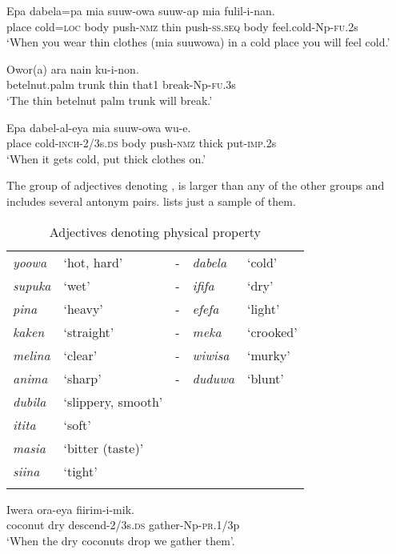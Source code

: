 \ea%
\label{ex:3:x1756}
\gll Epa dabela=pa mia suuw-owa  suuw-ap mia fulil-i-nan.\\
place cold=\textsc{loc} body push-\textsc{nmz} thin push-\textsc{ss}.\textsc{seq} body feel.cold-Np-\textsc{fu}.2s\\
\glt`When you wear thin clothes (mia suuwowa) in a cold place you will feel cold.' 
\z

\ea%
\label{ex:3:x76}
\gll Owor(a) ara   nain ku-i-non. \\
betelnut.palm trunk thin that1 break-Np-\textsc{fu}.3s\\
\glt`The thin betelnut palm trunk will break.'
\z

\ea%
\label{ex:3:x77}
\gll Epa dabel-al-eya mia suuw-owa   wu-e. \\
place cold-\textsc{inch}-2/3s.\textsc{ds} body push-\textsc{nmz} thick put-\textsc{imp}.2s\\
\glt`When it gets cold, put thick clothes on.'
\z

The group of adjectives denoting  ,  is larger than any of the other groups and includes several antonym pairs.  lists  just a sample of them.

\begin{table}
\caption{Adjectives denoting physical property}
\label{tab:3:physprop}
 
\begin{tabular}{>{\itshape}llc>{\itshape}ll}
\mytoprule
yoowa &`hot, hard' &- &dabela &`cold'\\
supuka &`wet' &- &ififa &`dry'\\
pina &`heavy' &- &efefa &`light'\\
kaken &`straight' &- &meka &`crooked'\\
melina &`clear' &- &wiwisa &`murky'\\
anima &`sharp' &- &duduwa &`blunt'\\
dubila &`slippery, smooth'&&&\\
itita &`soft'&&&\\
masia &`bitter (taste)'&&&\\
siina &`tight'&&&\\
\mybottomrule
\end{tabular}
\end{table}

\ea%
\label{ex:3:x78}
\gll Iwera  ora-eya fiirim-i-mik. \\
coconut dry descend-2/3s.\textsc{ds} gather-Np-\textsc{pr}.1/3p\\
\glt`When the dry coconuts drop we gather them'.
\z

